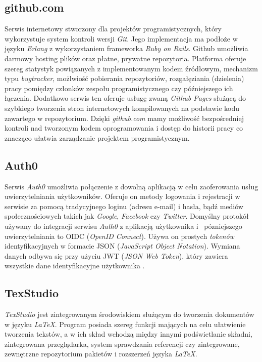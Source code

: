 \subsection{github.com}
Serwis internetowy stworzony dla projektów programistycznych, który wykorzystuje system kontroli wersji \textit{Git}. Jego implementacja ma podłoże w języku \textit{Erlang} z wykorzystaniem frameworka \textit{Ruby on Rails}. Github umożliwia darmowy hosting plików oraz płatne, prywatne repozytoria. Platforma oferuje szereg statystyk powiązanych z implementowanym kodem źródłowym, mechanizm typu \textit{bugtracker}, możlwiość pobierania repozytoriów, rozgałęziania (dzielenia) pracy pomiędzy członków zespołu programistycznego czy późniejszego ich łączenia. Dodatkowo serwis ten oferuje usługę zwaną \textit{Github Pages} służącą do szybkiego tworzenia stron internetowych kompilowanych na podstawie kodu zawartego w repozytorium. Dzięki \textit{github.com} mamy możliwość bezpośredniej kontroli nad tworzonym kodem oprogramowania i dostęp do historii pracy co znacząco ułatwia zarządzanie projektem programistycznym. 

\subsection{Auth0}
Serwis \textit{Auth0} umożliwia połączenie z dowolną aplikacją w celu zaoferowania usług uwierzytelniania użytkowników. Oferuje on metody logowania i rejestracji w serwisie za pomocą tradycyjnego loginu (adresu e-mail) i hasła, bądź mediów społecznościowych takich jak \textit{Google}, \textit{Facebook} czy \textit{Twitter}. Domyślny protokół używany do integracji serwisu \textit{Auth0} z aplikacją użytkownika i~ pózniejszego uwierzytelniania to OIDC (\textit{OpenID Connect}). Używa on prostych \textit{tokenów} identyfikacyjnych w formacie JSON (\textit{JavaScript Object Notation}). Wymiana danych odbywa się przy użyciu JWT (\textit{JSON Web Token}), który zawiera wszystkie dane identyfikacyjne użytkownika \cite{Auth}.

\subsection{TexStudio}
\textit{TexStudio} jest zintegrowanym środowiskiem służącym do tworzenia dokumentów w języku \textit{LaTeX}. Program posiada szereg funkcji mających na celu ułatwienie tworzenia tekstów, a w ich skład wchodzą między innymi podświetlanie składni, zintegrowana przeglądarka, system sprawdzania referencji czy zintegrowane, zewnętrzne repozytorium pakietów i rozszerzeń języka \textit{LaTeX}.